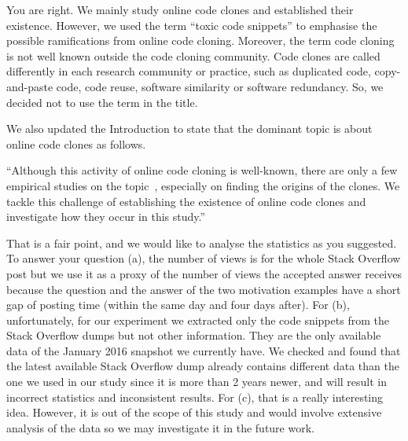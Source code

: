 \documentclass[a4paper,twoside,10pt]{reviewresponse}
\begin{document}
You are right. We mainly study online code clones and established their
existence. However, we used the term ``toxic code snippets'' to
emphasise the possible ramifications from online code cloning. Moreover, the
term code cloning is not well known outside the code cloning community. Code
clones are called differently in each research community or practice, such as
duplicated code, copy-and-paste code, code reuse, software similarity or
software redundancy. So, we decided not to use the term in the title.

We also updated the Introduction to state that the dominant topic is about
online code clones as follows.

``Although this activity of online code cloning is well-known, there are only a
few empirical studies on the topic~\citep{An2017,Abdalkareem2017,Baltes2017},
especially on finding the origins of the clones. We tackle this challenge of
establishing the existence of online code clones and investigate how they occur in
this study.'' %


That is a fair point, and we would like to analyse the statistics as you
suggested. To answer your question (a), the number of views is for the whole
Stack Overflow post but we use it as a proxy of the number of views the accepted
answer receives because the question and the answer of the two motivation
examples have a short gap of posting time (within the same day and four days
after). For (b), unfortunately, for our experiment we extracted only the code
snippets from the Stack Overflow dumps but not other information. They are the
only available data of the January 2016 snapshot we currently have. We checked
and found that the latest available Stack Overflow dump already contains
different data than the one we used in our study since it is more than 2
years newer, and will result in incorrect statistics and inconsistent results.
For (c), that is a really interesting idea. However, it is out of the scope of
this study and would involve extensive analysis of the data so we may
investigate it in the future work.
\end{document}
